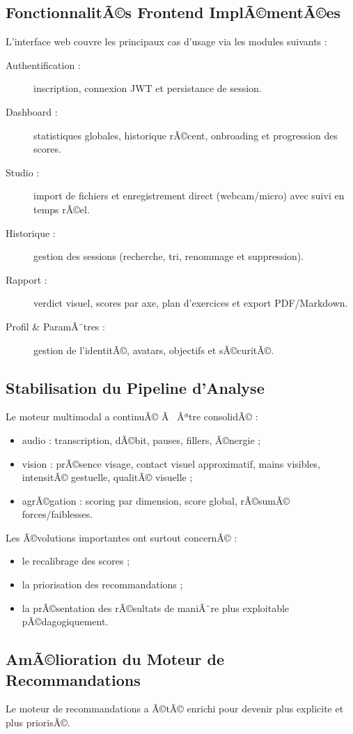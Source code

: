 ﻿\documentclass[12pt,a4paper]{article}
\begin{document}
\subsection{FonctionnalitÃ©s Frontend ImplÃ©mentÃ©es}
L'interface web couvre les principaux cas d'usage via les modules suivants :
\begin{description}
    \item[Authentification :] inscription, connexion JWT et persistance de session.
    \item[Dashboard :] statistiques globales, historique rÃ©cent, onbroading et progression des scores.
    \item[Studio :] import de fichiers et enregistrement direct (webcam/micro) avec suivi en temps rÃ©el.
    \item[Historique :] gestion des sessions (recherche, tri, renommage et suppression).
    \item[Rapport :] verdict visuel, scores par axe, plan d'exercices et export PDF/Markdown.
    \item[Profil \& ParamÃ¨tres :] gestion de l'identitÃ©, avatars, objectifs et sÃ©curitÃ©.
\end{description}

\subsection{Stabilisation du Pipeline d'Analyse}
Le moteur multimodal a continuÃ© Ã  Ãªtre consolidÃ© :
\begin{itemize}
    \item audio : transcription, dÃ©bit, pauses, fillers, Ã©nergie ;
    \item vision : prÃ©sence visage, contact visuel approximatif, mains visibles, intensitÃ© gestuelle, qualitÃ© visuelle ;
    \item agrÃ©gation : scoring par dimension, score global, rÃ©sumÃ© forces/faiblesses.
\end{itemize}

Les Ã©volutions importantes ont surtout concernÃ© :
\begin{itemize}
    \item le recalibrage des scores ;
    \item la priorisation des recommandations ;
    \item la prÃ©sentation des rÃ©sultats de maniÃ¨re plus exploitable pÃ©dagogiquement.
\end{itemize}

\subsection{AmÃ©lioration du Moteur de Recommandations}
Le moteur de recommandations a Ã©tÃ© enrichi pour devenir plus explicite et plus priorisÃ©.
\end{document}
